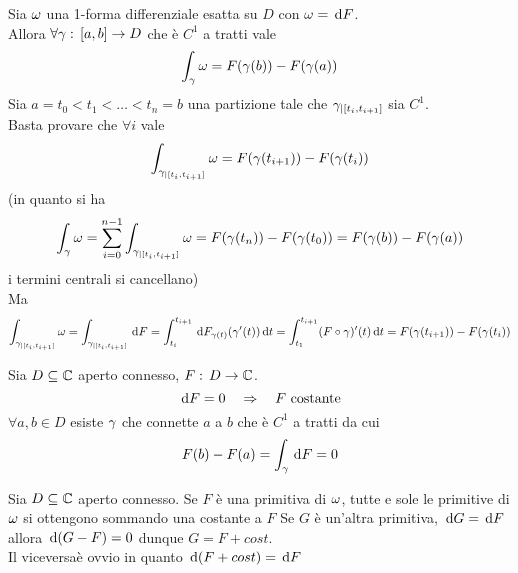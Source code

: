 \begin{lem}Sia $\omega$ una 1-forma differenziale esatta su $D$ con $\omega = \, \mathrm{d} F$.\\
Allora $\forall \gamma:\, [a,b]\to D $ che \`e $C^1$ a tratti vale
$$\int_\gamma \omega = F(\gamma(b))-F(\gamma(a))$$
\proof Sia $a=t_0<t_1<\dots<t_n=b$ una partizione tale che $\gamma_{\vert [t_i,t_{i+1}]}$ sia $C^1$.\\
Basta provare che $\forall i$ vale
$$\int_{\gamma_{\vert [t_i,t_{i+1}]}}  \omega =F(\gamma(t_{i+1}))-F(\gamma(t_i))$$ 
(in quanto si ha 
$$\int_\gamma \omega = \sum_{i=0}^{n-1} \int_{\gamma_{\vert [t_i,t_{i+1}]} } \omega= F(\gamma(t_n))-F(\gamma(t_0))=F(\gamma(b))-F(\gamma(a))$$
i termini centrali si cancellano)\\
Ma 
$$\int_{\gamma_{\vert [t_i,t_{i+1}]}}\omega = \int_{\gamma_{\vert [t_i,t_{i+1}]}}\, \mathrm{d} F =\int_{t_i}^{t_{i+1}} \, \mathrm{d} F_{\gamma(t)} (\gamma'(t))\, \mathrm{d} t =\int_{t_1}^{t_{i+1}} (F\circ \gamma)'(t)\, \mathrm{d}t = F(\gamma(t_{i+1}))-F(\gamma(t_i)) $$
\end{lem}
\begin{cor}Sia $D\subseteq \mathbb{C}$ aperto connesso, $F:\, D\to \mathbb{C}$.
$$\, \mathrm{d} F = 0\quad \Rightarrow \quad F \text{ costante}$$
\proof $\forall a,b\in D$ esiste $\gamma$ che connette $a$ a $b$ che \`e $C^1$ a tratti da cui 
$$F(b)-F(a) =\int_\gamma \, \mathrm{d} F = 0$$
\end{cor}

\begin{cor}Sia $D\subseteq \mathbb{C}$ aperto connesso. Se $F$ \`e una primitiva di $\omega$, tutte e sole le primitive di $\omega$ si ottengono sommando una costante a $F$
\proof Se $G$ \`e un'altra primitiva, $\, \mathrm{d} G = \, \mathrm{d} F$ allora $\, \mathrm{d} (G-F) =0$ dunque $G=F + cost$.\\
Il viceversa\`e ovvio in quanto $\, \mathrm{d} (F+cost)=\, \mathrm{d} F$
\end{cor}

